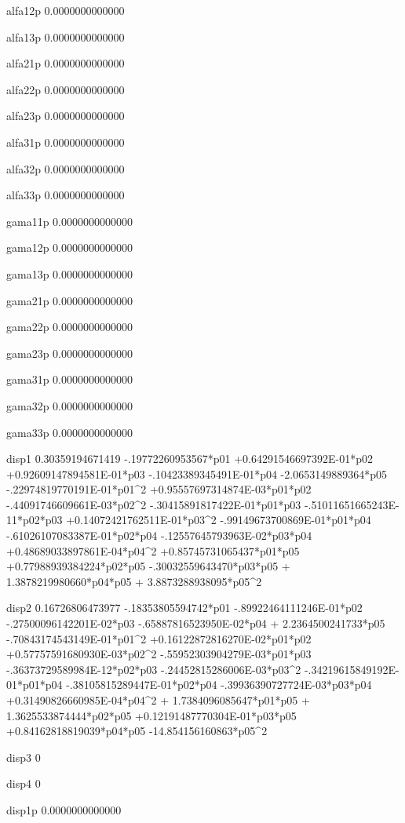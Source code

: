  alfa12p
   0.0000000000000 
  
 alfa13p
   0.0000000000000 
  
 alfa21p
   0.0000000000000 
  
 alfa22p
   0.0000000000000 
  
 alfa23p
   0.0000000000000 
  
 alfa31p
   0.0000000000000 
  
 alfa32p
   0.0000000000000 
  
 alfa33p
   0.0000000000000 
  
 gama11p
   0.0000000000000 
  
 gama12p
   0.0000000000000 
  
 gama13p
   0.0000000000000 
  
 gama21p
   0.0000000000000 
  
 gama22p
   0.0000000000000 
  
 gama23p
   0.0000000000000 
  
 gama31p
   0.0000000000000 
  
 gama32p
   0.0000000000000 
  
 gama33p
   0.0000000000000 
  
 disp1  
  0.30359194671419  -.19772260953567*p01 +0.64291546697392E-01*p02 +0.92609147894581E-01*p03  -.10423389345491E-01*p04  -2.0653149889364*p05  -.22974819770191E-01*p01^2 +0.95557697314874E-03*p01*p02  -.44091746609661E-03*p02^2  -.30415891817422E-01*p01*p03  -.51011651665243E-11*p02*p03 +0.14072421762511E-01*p03^2  -.99149673700869E-01*p01*p04  -.61026107083387E-01*p02*p04  -.12557645793963E-02*p03*p04 +0.48689033897861E-04*p04^2 +0.85745731065437*p01*p05 +0.77988939384224*p02*p05  -.30032559643470*p03*p05 + 1.3878219980660*p04*p05 + 3.8873288938095*p05^2 
  
 disp2  
  0.16726806473977  -.18353805594742*p01  -.89922464111246E-01*p02  -.27500096142201E-02*p03  -.65887816523950E-02*p04 + 2.2364500241733*p05  -.70843174543149E-01*p01^2 +0.16122872816270E-02*p01*p02 +0.57757591680930E-03*p02^2  -.55952303904279E-03*p01*p03  -.36373729589984E-12*p02*p03  -.24452815286006E-03*p03^2  -.34219615849192E-01*p01*p04  -.38105815289447E-01*p02*p04  -.39936390727724E-03*p03*p04 +0.31490826660985E-04*p04^2 + 1.7384096085647*p01*p05 + 1.3625533874444*p02*p05 +0.12191487770304E-01*p03*p05 +0.84162818819039*p04*p05  -14.854156160863*p05^2 
  
 disp3  
 0 
  
 disp4  
 0 
  
 disp1p 
   0.0000000000000 
  
